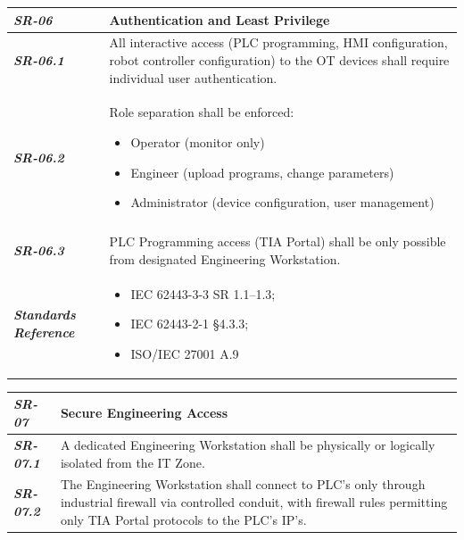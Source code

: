 \documentclass[11pt,a4paper]{article}
\begin{document}
\begin{tabularx}{\textwidth}{>{\bfseries}p{2.5cm} X}
    \textit{SR-06} & \textbf{Authentication and Least Privilege} \vspace{0.5em}\\
\toprule
\textit{SR-06.1} &
    All interactive access (PLC programming, HMI configuration, robot controller configuration) to the OT devices shall require individual user authentication.
    \vspace{0.5em}
\\
\textit{SR-06.2} &
    Role separation shall be enforced:
    \begin{itemize}[label=-, noitemsep, topsep=0pt, leftmargin=*]
        \item Operator (monitor only)
        \item Engineer (upload programs, change parameters)
        \item Administrator (device configuration, user management)
    \end{itemize} \vspace{1em} \\ 
    \vspace{0.5em}
    \\
\textit{SR-06.3} &
    PLC Programming access (TIA Portal) shall be only possible from designated Engineering Workstation.
    \vspace{0.5em}
    \\
\midrule
    \textit{Standards Reference} &
\begin{itemize}[label=-, noitemsep, topsep=0pt, leftmargin=*]
    \item IEC 62443-3-3 SR 1.1–1.3; 
    \item IEC 62443-2-1 §4.3.3; 
    \item ISO/IEC 27001 A.9
\end{itemize} \vspace{1em} \\ 
\end{tabularx}
\vspace{2em}

\begin{tabularx}{\textwidth}{>{\bfseries}p{2.5cm} X}
    \textit{SR-07} & \textbf{Secure Engineering Access} \vspace{0.5em}\\
\toprule
\textit{SR-07.1} &
    A dedicated Engineering Workstation shall be physically or logically isolated from the IT Zone.
    \vspace{0.5em}
\\
\textit{SR-07.2} &
    The Engineering Workstation shall connect to PLC's only through industrial firewall via controlled conduit, with firewall rules permitting only TIA Portal protocols to the PLC's IP's. 
    \vspace{0.5em}
    \\
\end{tabularx}
\vspace{2em}
\end{document}
